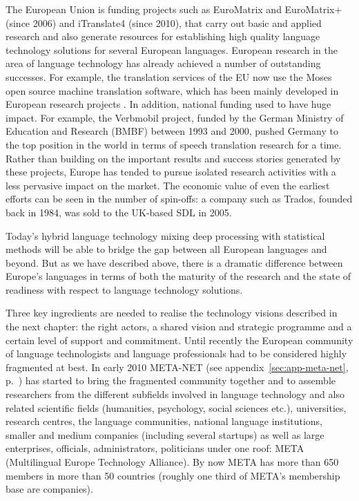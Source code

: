 \documentclass[10pt, plain]{../../metanetpaper}
\begin{document}
\begin{multicols}{2}
The European Union is funding projects such as EuroMatrix and EuroMatrix+ (since 2006) and iTranslate4 (since 2010), that carry out basic and applied research and also generate resources for establishing high quality language technology solutions for several European languages. European research in the area of language technology has already achieved a number of outstanding successes. For example, the translation services of the EU now use the Moses open source machine translation software, which has been mainly developed in European research projects \cite{moses}. In addition, national funding used to have huge impact. For example, the Verbmobil project, funded by the German Ministry of Education and Research (BMBF) between 1993 and 2000, pushed Germany to the top position in the world in terms of speech translation research for a time. Rather than building on the important results and success stories generated by these projects, Europe has tended to pursue isolated research activities with a less pervasive impact on the market. The economic value of even the earliest efforts can be seen in the number of spin-offs: a company such as Trados, founded back in 1984, was sold to the UK-based SDL in 2005.

Today’s hybrid language technology mixing deep processing with statistical methods will be able to bridge the gap between all European languages and beyond. But as we have described above, there is a dramatic difference between Europe’s languages in terms of both the maturity of the research and the state of readiness with respect to language technology solutions. 

Three key ingredients are needed to realise the technology visions described in the next chapter: the right actors, a shared vision and strategic programme and a certain level of support and commitment. Until recently the European community of language technologists and language professionals had to be considered highly fragmented at best. In early 2010 META-NET (see appendix~\ref{sec:app-meta-net}, p.~\pageref{sec:app-meta-net}) has started to bring the fragmented community together and to assemble researchers from the different subfields involved in language technology and also related scientific fields (humanities, psychology, social sciences etc.), universities, research centres, the language communities, national language institutions, smaller and medium companies (including several startups) as well as large enterprises, officials, administrators, politicians under one roof: META (Multilingual Europe Technology Alliance). By now META has more than 650 members in more than 50 countries (roughly one third of META's membership base are companies). 


\end{multicols}
\end{document}
